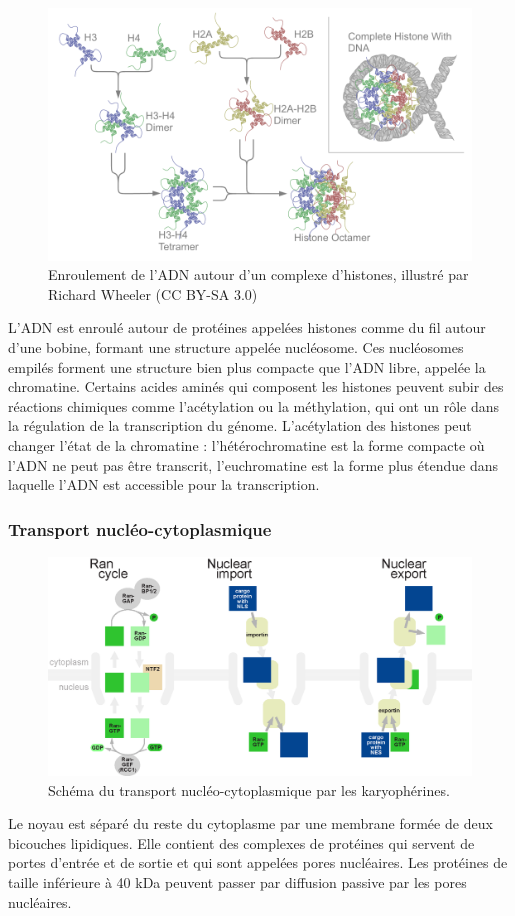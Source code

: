 \begin{figure}[h!]
\includegraphics[scale=0.3]{Nucleosome_structure_by_richard_wheeler}
\caption{Enroulement de l'ADN autour d'un complexe d'histones, illustré par Richard Wheeler (CC BY-SA 3.0)}
\end{figure}

L'ADN est enroulé autour de protéines appelées histones comme du fil autour d'une bobine, formant une structure appelée nucléosome. Ces nucléosomes empilés forment une structure bien plus compacte que l'ADN libre, appelée la chromatine. Certains acides aminés qui composent les histones peuvent subir des réactions chimiques comme l'acétylation ou la méthylation, qui ont un rôle dans la régulation de la transcription du génome. L'acétylation des histones peut changer l'état de la chromatine : l'hétérochromatine est la forme compacte où l'ADN ne peut pas être transcrit, l'euchromatine est la forme plus étendue dans laquelle l'ADN est accessible pour la transcription. 

\subsubsection{Transport nucléo-cytoplasmique}
\begin{figure}
\includegraphics[scale=0.8]{Rancycle_nuclearimport_nuclearexport.png}
\caption{Schéma du transport nucléo-cytoplasmique par les karyophérines.}
\end{figure}
Le noyau est séparé du reste du cytoplasme par une membrane formée de deux bicouches lipidiques. Elle contient des complexes de protéines qui servent de portes d'entrée et de sortie  et qui sont appelées pores nucléaires. Les protéines de taille inférieure à 40 kDa peuvent passer par diffusion passive par les pores nucléaires. 

